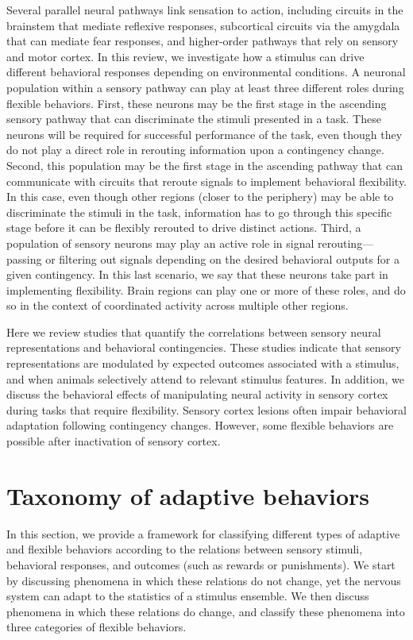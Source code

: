 Several parallel neural pathways link sensation to action, including circuits in the brainstem that mediate reflexive responses, subcortical circuits via the amygdala that can mediate fear responses, and higher-order pathways that rely on sensory and motor cortex. In this review, we investigate how a stimulus can drive different behavioral responses depending on environmental conditions. A neuronal population within a sensory pathway can play at least three different roles during flexible behaviors. First, these neurons may be the first stage in the ascending sensory pathway that can discriminate the stimuli presented in a task. These neurons will be required for successful performance of the task, even though they do not play a direct role in rerouting information upon a contingency change. Second, this population may be the first stage in the ascending pathway that can communicate with circuits that reroute signals to implement behavioral flexibility. In this case, even though other regions (closer to the periphery) may be able to discriminate the stimuli in the task, information has to go through this specific stage before it can be flexibly rerouted to drive distinct actions.
% 
Third, a population of sensory neurons may play an active role in signal rerouting---passing or filtering out signals depending on the desired behavioral outputs for a given contingency. In this last scenario, we say that these neurons take part in implementing flexibility. 
%
Brain regions can play one or more of these roles, and do so in the context of coordinated activity across multiple other regions.

Here we review studies that quantify the correlations between sensory neural representations and behavioral contingencies. These studies indicate that sensory representations are modulated by expected outcomes associated with a stimulus, and when animals selectively attend to relevant stimulus features.
%
In addition, we discuss the behavioral effects of manipulating neural activity in sensory cortex during tasks that require flexibility. Sensory cortex lesions often impair behavioral adaptation following contingency changes. However, some flexible behaviors are possible after inactivation of sensory cortex.

\section{Taxonomy of adaptive behaviors}
%
In this section, we provide a framework for classifying different types of adaptive and flexible behaviors according to the relations between sensory stimuli, behavioral responses, and outcomes (such as rewards or punishments). We start by discussing phenomena in which these relations do not change, yet the nervous system can adapt to the statistics of a stimulus ensemble. We then discuss phenomena in which these relations do change, and classify these phenomena into three categories of flexible behaviors.

